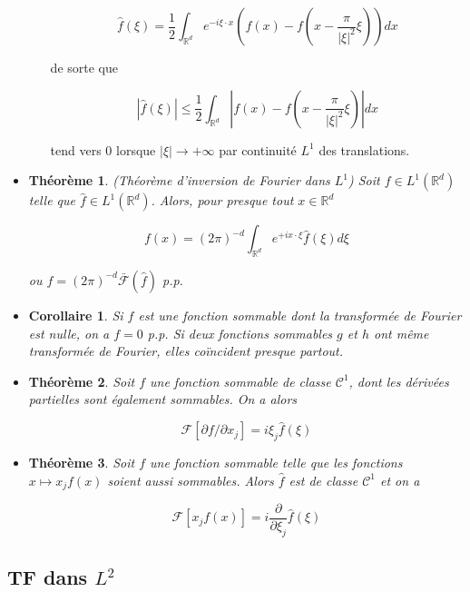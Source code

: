 \documentclass[10pt,a4paper,oneside]{article}
\newtheorem{theoreme}{Théorème}
\newtheorem{corollaire}{Corollaire}
\begin{document}
\begin{itemize}
\begin{itemize}
\[ \hat{f}(\xi) = \frac{1}{2} \int_{\mathbb{R}^d} e^{-i \xi \cdot x} \left( f(x) - f(x - \frac{\pi}{|\xi|^2}\xi) \right) dx \]

de sorte que

\[ |\hat{f}(\xi)| \leq \frac{1}{2} \int_{\mathbb{R}^d} | f(x) - f(x - \frac{\pi}{|\xi|^2}\xi) | dx \]

tend vers 0 lorsque $|\xi| \to +\infty$ par continuité $L^1$ des translations.

\end{itemize}

\item
\begin{theoreme}
(Théorème d'inversion de Fourier dans $L^1$)
Soit $f \in L^1(\mathbb{R}^d)$ telle que $\hat{f} \in L^1(\mathbb{R}^d)$. Alors, pour presque tout $x \in \mathbb{R}^d$

\[ f(x) = (2\pi)^{-d} \int_{\mathbb{R}^d} e^{+i x \cdot \xi} \hat{f}(\xi) d\xi \]

ou $f = (2\pi)^{-d} \bar{\mathcal{F}}(\hat{f})$ p.p.
\end{theoreme}

\item
\begin{corollaire}
Si $f$ est une fonction sommable dont la transformée de Fourier est nulle, on a $f = 0$ p.p. Si deux fonctions sommables $g$ et $h$ ont même transformée de Fourier, elles coïncident presque partout.
\end{corollaire}

\item
\begin{theoreme}
Soit $f$ une fonction sommable de classe $\mathcal{C}^1$, dont les dérivées partielles sont également sommables. On a alors

\[ \mathcal{F}[\partial f / \partial x_j] = i \xi_j \hat{f}(\xi) \]
\end{theoreme}

\item
\begin{theoreme}
Soit $f$ une fonction sommable telle que les fonctions $x \mapsto x_j f(x)$ soient aussi sommables. Alors $\hat{f}$ est de classe $\mathcal{C}^1$ et on a

\[ \mathcal{F}[x_j f(x)] = i \frac{\partial}{\partial \xi_j}\hat{f}(\xi) \]
\end{theoreme}

\end{itemize}

\subsection{TF dans $L^2$}
\end{document}
